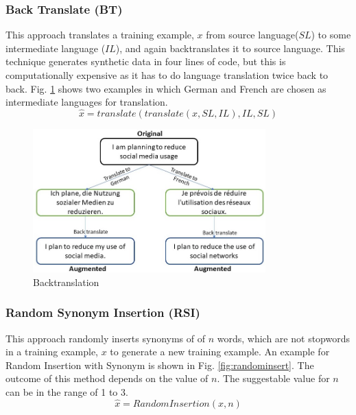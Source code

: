 \documentclass{article}
\begin{document}
\subsubsection{Back Translate (BT)}
This approach translates a training example, $x$ from source language($SL$) to some intermediate language ($IL$), and again backtranslates it to source language. This technique generates synthetic data in four lines of code, but this is computationally expensive as it has to do language translation twice back to back. Fig. \ref{fig:backtranslate} shows two examples in which German and French are chosen as intermediate languages for translation.
\begin{equation}
\hat{x} = translate( translate(x, SL, IL), IL, SL)
\end{equation}
\begin{figure}[h!]
\centering
  \includegraphics[width=0.8\textwidth]{backtranslate.jpg}
  \caption{Backtranslation}
  \label{fig:backtranslate}
\end{figure}

\subsubsection{Random Synonym Insertion (RSI)}
This approach randomly inserts synonyms of of $n$ words, which are not stopwords in a training example, $x$ to generate a new training example. An example for Random Insertion with Synonym is shown in Fig. \ref{fig:randominsert}. The outcome of this method depends on the value of $n$. The suggestable value for $n$ can be in the range of 1 to 3. 
\begin{equation}
\hat{x} = RandomInsertion(x, n)
\end{equation}
\end{document}
